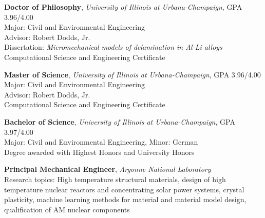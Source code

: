 \usepackage{ifthen}
\usepackage[sorting=ydnt,style=numeric,defernumbers]{biblatex}










\makecvtitle


\textbf{Doctor of Philosophy}, \emph{University of Illinois at Urbana-Champaign},
GPA 3.96/4.00\\
Major: Civil and Environmental Engineering\\
Advisor: Robert Dodds, Jr. \\
Dissertation: \textit{Micromechanical models of delamination in Al-Li
alloys}\\
Computational Science and Engineering Certificate

\textbf{Master of Science}, \emph{University of Illinois at Urbana-Champaign},
GPA 3.96/4.00 \\
Major: Civil and Environmental Engineering\\
Advisor: Robert Dodds, Jr. \\
Computational Science and Engineering Certificate

\textbf{Bachelor of Science}, \emph{University of Illinois at Urbana-Champaign},
GPA 3.97/4.00 \\
Major: Civil and Environmental Engineering, Minor: German\\
Degree awarded with Highest Honors and University Honors 


\textbf{Principal Mechanical Engineer}, \emph{Argonne National Laboratory}
\\
Research topics: High temperature structural materials, design
of high temperature nuclear reactors and concentrating solar power systems,
crystal plasticity, machine learning
methods for material and material model design,
qualification of AM nuclear components

